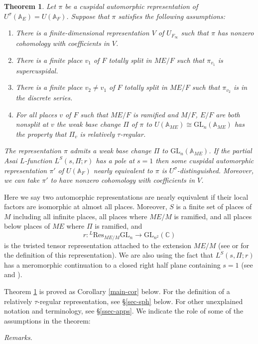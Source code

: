 \documentclass[12pt]{amsart}
\newtheorem{thm}{Theorem}[section]
\theoremstyle{remark}
\numberwithin{equation}{section}
\newcommand{\A}{\mathbb{A}}
\newcommand{\GL}{\mathrm{GL}}
\newcommand{\lto}{\longrightarrow}
\newcommand{\CC}{\mathbb{C}}
\theoremstyle{definition}
\numberwithin{equation}{subsection}
\begin{document}
\begin{thm} \label{intro-thm2} Let $\pi$ be a cuspidal automorphic representation of $U^{\sigma}(\A_E)=U(\A_F)$.
Suppose that $\pi$ satisfies the following assumptions:
\begin{enumerate}
\item There is a finite-dimensional representation $V$ of $U_{F_{\infty}}$ such that $\pi$ has
nonzero cohomology with coefficients in $V$.
\item There is a finite place $v_1$ of $F$ totally split in $ME/F$ such that $\pi_{v_1}$ is supercuspidal.
\item There is a finite place $v_2 \neq v_1$ of $F$ totally split in $ME/F$ such that $\pi_{v_2}$ is in the discrete series.
\item For all places $v$ of $F$ such that $ME/F$ is ramified and $M/F$, $E/F$ are both nonsplit at $v$ the weak base change $\Pi$ of $\pi$ to $U(\A_{ME}) \cong \GL_{n}(\A_{ME})$ has the property that $\Pi_v$ is relatively $\tau$-regular.
\end{enumerate}
The representation $\pi$ admits a weak base change $\Pi$ to $\GL_n(\A_{ME})$. If the partial Asai $L$-function $L^S(s,\Pi;r)$ has a pole at $s=1$ then some cuspidal automorphic representation
$\pi'$ of $U(\A_F)$ nearly equivalent to $\pi$ is $U^{\sigma}$-distinguished.
 Moreover, we can take $\pi'$ to have nonzero cohomology
with coefficients in $V$.
\end{thm}
\noindent Here we say two automorphic representations are nearly equivalent if their local factors are isomorphic at almost all places.
Moreover, $S$ is a finite set of places of $M$ including all infinite places, all places where $ME/M$ is ramified, and all places below places of $ME$ where $\Pi$ is ramified, and
$$
r:{}^L\mathrm{Res}_{ME/M}\GL_n \lto \GL_{n^2}(\CC)
$$
is the twisted tensor representation attached to the extension $ME/M$ (see \cite{FlickerDist} or
\cite[\S 6]{Ramakrishnan} for the definition of this representation).  We are also using the fact that $L^S(s,\Pi;r)$ has a meromorphic continuation to a closed right half plane containing $s=1$ (see \cite{FlickerDist} and \cite{FlickerZin}).


Theorem \ref{intro-thm2} is proved as Corollary \ref{main-cor} below.  For the definition of a relatively $\tau$-regular representation, see \S \ref{sec-sph} below. For other unexplained notation and terminology, see \S \ref{ssec-apps}.
We indicate the role of some of the assumptions in the theorem:

\noindent \emph{Remarks.}
\end{document}
